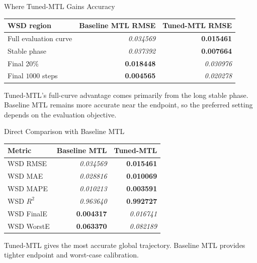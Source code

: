 \documentclass[aspectratio=169]{beamer}
\newcommand{\best}[1]{\textbf{#1}}
\newcommand{\second}[1]{\emph{#1}}
\begin{document}
\begin{frame}{Where Tuned-MTL Gains Accuracy}
  \begin{center}
  \small
  \begin{tabular}{lrr}
    \toprule
    WSD region & Baseline MTL RMSE & Tuned-MTL RMSE \\
    \midrule
    Full evaluation curve & \second{0.034569} & \best{0.015461} \\
    Stable phase & \second{0.037392} & \best{0.007664} \\
    Final 20\% & \best{0.018448} & \second{0.030976} \\
    Final \(1000\) steps & \best{0.004565} & \second{0.020278} \\
    \bottomrule
  \end{tabular}
  \end{center}
  Tuned-MTL's full-curve advantage comes primarily from the long stable phase. Baseline MTL remains more accurate near the endpoint, so the preferred setting depends on the evaluation objective.
\end{frame}

\begin{frame}{Direct Comparison with Baseline MTL}
  \begin{center}
  \small
  \begin{tabular}{lrr}
    \toprule
    Metric & Baseline MTL & Tuned-MTL \\
    \midrule
    WSD RMSE & \second{0.034569} & \best{0.015461} \\
    WSD MAE & \second{0.028816} & \best{0.010069} \\
    WSD MAPE & \second{0.010213} & \best{0.003591} \\
    WSD \(R^2\) & \second{0.963640} & \best{0.992727} \\
    WSD FinalE & \best{0.004317} & \second{0.016741} \\
    WSD WorstE & \best{0.063370} & \second{0.082189} \\
    \bottomrule
  \end{tabular}
  \end{center}
  Tuned-MTL gives the most accurate global trajectory. Baseline MTL provides tighter endpoint and worst-case calibration.
\end{frame}
\end{document}
